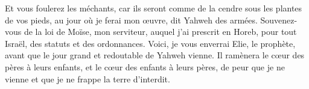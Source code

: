 \begin{multicols}{2}
Et vous foulerez les méchants, car ils seront comme de la cendre sous les plantes de vos pieds, au jour où je ferai mon œuvre, dit Yahweh des armées.
Souvenez-vous de la loi de Moïse, mon serviteur, auquel j’ai prescrit en Horeb, pour tout Israël, des statuts et des ordonnances.
Voici, je vous enverrai Elie, le prophète, avant que le jour grand et redoutable de Yahweh vienne.
Il ramènera le cœur des pères à leurs enfants, et le cœur des enfants à leurs pères, de peur que je ne vienne et que je ne frappe la terre d’interdit.
\PPE{}
\end{multicols}
